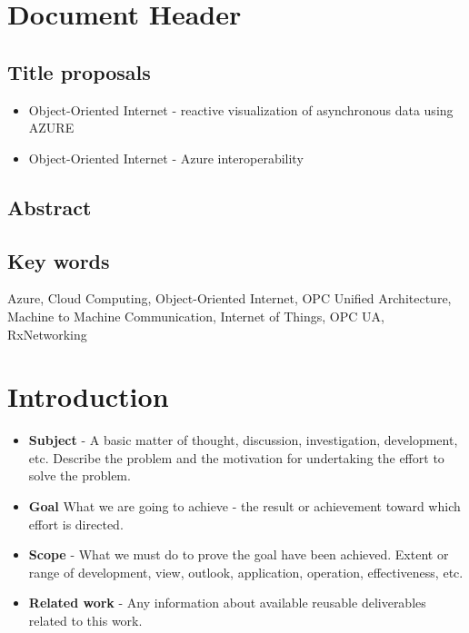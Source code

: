 \documentclass[
]{article}
\date{}
\providecommand{\tightlist}{%
  \setlength{\itemsep}{0pt}\setlength{\parskip}{0pt}}
\begin{document}
\hypertarget{document-header}{%
\section{Document Header}\label{document-header}}

\hypertarget{title-proposals}{%
\subsection{Title proposals}\label{title-proposals}}

\begin{itemize}
\tightlist
\item
  Object-Oriented Internet - reactive visualization of asynchronous data
  using AZURE
\item
  Object-Oriented Internet - Azure interoperability
\end{itemize}

\hypertarget{abstract}{%
\subsection{Abstract}\label{abstract}}

\hypertarget{key-words}{%
\subsection{Key words}\label{key-words}}

Azure, Cloud Computing, Object-Oriented Internet, OPC Unified
Architecture, Machine to Machine Communication, Internet of Things, OPC
UA, RxNetworking

\hypertarget{introduction}{%
\section{Introduction}\label{introduction}}

\begin{itemize}
\tightlist
\item
  \textbf{Subject} - A basic matter of thought, discussion,
  investigation, development, etc. Describe the problem and the
  motivation for undertaking the effort to solve the problem.
\item
  \textbf{Goal} What we are going to achieve - the result or achievement
  toward which effort is directed.
\item
  \textbf{Scope} - What we must do to prove the goal have been achieved.
  Extent or range of development, view, outlook, application, operation,
  effectiveness, etc.
\item
  \textbf{Related work} - Any information about available reusable
  deliverables related to this work.
\end{itemize}
\end{document}
